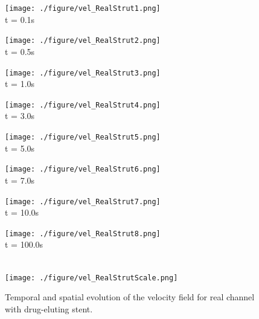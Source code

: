 \documentclass[10pt,fleqn,a4paper,twoside]{article}
\begin{document}
\vspace{1cm} 
\begin{figure}[H]
     \begin{minipage}{.50\linewidth}
      \centering
      \texttt{[image: ./figure/vel\_RealStrut1.png]}\\
      t = 0.1s
     \end{minipage}%
     \begin{minipage}{.50\linewidth}
      \centering
      \texttt{[image: ./figure/vel\_RealStrut2.png]}\\
      t = 0.5s
     \end{minipage}
     \begin{minipage}{.50\linewidth}
     \medskip
      \centering
      \texttt{[image: ./figure/vel\_RealStrut3.png]}\\
      t = 1.0s
     \end{minipage}%
     \begin{minipage}{.50\linewidth}
     \medskip
      \centering
      \texttt{[image: ./figure/vel\_RealStrut4.png]}\\
      t = 3.0s
     \end{minipage}
     \begin{minipage}{.50\linewidth}
      \centering
      \texttt{[image: ./figure/vel\_RealStrut5.png]}\\
      t = 5.0s
     \end{minipage}%
     \begin{minipage}{.50\linewidth}
      \centering
      \texttt{[image: ./figure/vel\_RealStrut6.png]}\\
      t = 7.0s
     \end{minipage}
     \begin{minipage}{.50\linewidth}
     \medskip
      \centering
      \texttt{[image: ./figure/vel\_RealStrut7.png]}\\
      t = 10.0s
     \end{minipage}%
     \begin{minipage}{.50\linewidth}
     \medskip
      \centering
      \texttt{[image: ./figure/vel\_RealStrut8.png]}\\
      t = 100.0s
     \end{minipage}\\[10pt]
      \centering
      \texttt{[image: ./figure/vel\_RealStrutScale.png]}\\
     \medskip
      \label{velocity field real stent}
    \caption{
Temporal and spatial evolution of the velocity field for real channel with
drug-eluting stent.}
\end{figure}
\end{document}
